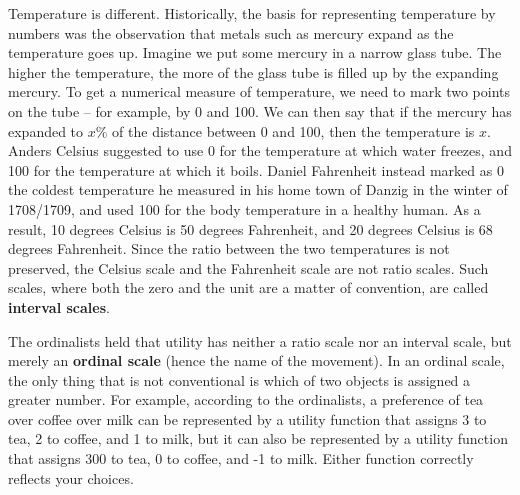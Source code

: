 Temperature is different. Historically, the basis for representing
temperature by numbers was the observation that metals such as mercury
expand as the temperature goes up. Imagine we put some mercury in a
narrow glass tube. The higher the temperature, the more of the glass
tube is filled up by the expanding mercury. To get a numerical measure
of temperature, we need to mark two points on the tube -- for example,
by 0 and 100. We can then say that if the mercury has expanded to
$x\%$ of the distance between 0 and 100, then the temperature is
$x$. Anders Celsius suggested to use 0 for the temperature at which
water freezes, and 100 for the temperature at which it boils. Daniel
Fahrenheit instead marked as 0 the coldest temperature he measured in
his home town of Danzig in the winter of 1708/1709, and used 100 for
the body temperature in a healthy human. As a result, 10 degrees
Celsius is 50 degrees Fahrenheit, and 20 degrees Celsius is 68 degrees
Fahrenheit. Since the ratio between the two temperatures is not
preserved, the Celsius scale and the Fahrenheit scale are not ratio
scales.%
Such scales, where both the zero and the unit are a matter of
convention, are called \textbf{interval scales}.


The ordinalists held that utility has neither a ratio scale nor an
interval scale, but merely an \textbf{ordinal scale} (hence the name
of the movement). In an ordinal scale, the only thing that is not
conventional is which of two objects is assigned a greater number. For
example, according to the ordinalists, a preference of tea over coffee
over milk can be represented by a utility function that assigns 3 to
tea, 2 to coffee, and 1 to milk, but it can also be represented by a
utility function that assigns 300 to tea, 0 to coffee, and -1 to
milk. Either function correctly reflects your choices.

